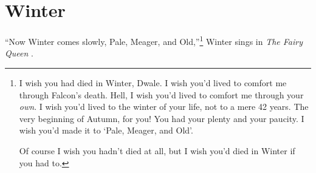 \documentclass[12pt,oneside]{memoir}
\begin{document}
\clearpage

\section*{Winter}

``Now Winter comes slowly, Pale, Meager, and Old,''\footnote{I wish you had died in Winter, Dwale. I wish you'd lived to comfort me through Falcon's death. Hell, I wish you'd lived to comfort me through your \emph{own}. I wish you'd lived to the winter of your life, not to a mere 42 years. The very beginning of Autumn, for you! You had your plenty and your paucity. I wish you'd made it to `Pale, Meager, and Old'.\par Of course I wish you hadn't died at all, but I wish you'd died in Winter if you had to.} Winter sings in \emph{The Fairy Queen} \parencite{purcell}.
\end{document}
